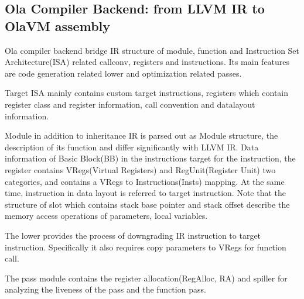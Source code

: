 \subsection{Ola Compiler Backend: from LLVM IR to OlaVM assembly}

Ola compiler backend bridge IR structure of module, function and Instruction Set Architecture(ISA) related callconv, registers and instructions.
Its main features are code generation related lower and optimization related passes.

Target ISA mainly contains custom target instructions, registers which contain register class and register information, call convention and datalayout information.

Module in addition to inheritance IR is parsed out as Module structure, the description of its function and differ significantly with LLVM IR.
Data information of Basic Block(BB) in the instructions target for the instruction, the register contains VRegs(Virtual Registers) and RegUnit(Register Unit) two categories, and contains a VRegs to Instructions(Insts) mapping.
At the same time, instruction in data layout is referred to target instruction. Note that the structure of slot which contains stack base pointer and stack offset describe the memory access operations of parameters, local variables.

The lower provides the process of downgrading IR instruction to target instruction. Specifically it also requires copy parameters to VRegs for function call.

The pass module contains the register allocation(RegAlloc, RA) and spiller for analyzing the liveness of the pass and the function pass.











